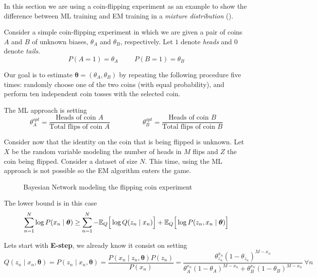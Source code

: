In this section we are using a coin-flipping experiment as an example to show the difference between ML training and EM training in a \emph{mixture distribution} (\cite{do2008expectation}).

Consider a simple coin-flipping experiment in which we are given a pair of coins \(A\) and \(B\) of unknown biases, \(\theta_{A}\)   and \(\theta_{B}\), respectively. Let \(1\) denote \textit{heads} and \(0\) denote \textit{tails}.
\[
  P(A = 1) = \theta_{A} \hspace{1cm} P(B = 1) = \theta_{B}
\]

Our goal is to estimate \(\bm{\theta} = (\theta_{A}, \theta_{B})\)  by repeating the following procedure five times: randomly choose one of the two coins (with equal probability), and perform ten independent coin tosses with the selected coin.

The ML approach is setting
\[
  \theta_{A}^{opt} = \frac{\text{Heads of coin }A}{\text{Total flips of coin }A} \hspace{2cm} \theta_{B}^{opt} = \frac{\text{Heads of coin }B}{\text{Total flips of coin }B}
\]

Consider now that the identity on the coin that is being flipped is unknown. Let \(X\) be the random variable modeling the number of heads in \(M\) flips and \(Z\) the coin being flipped. Consider a dataset of size \(N\). This time, using the ML approach is not possible so the EM algorithm enters the game.

\begin{figure}
  \centering
  \caption{Bayesian Network modeling the flipping coin experiment}
\end{figure}


The lower bound is in this case
\[
  \sum_{n=1}^{N}\log{P(x_{n} \mid \bm{\theta})} \geq \sum_{n=1}^{N}-\mathbb{E}_{Q}\Big[\log{Q(z_{n}\mid x_{n})}\Big] + \mathbb{E}_{Q}\Big[\log{P(z_{n}, x_{n} \mid \bm{\theta})}\Big]
\]

Lets start with \textbf{E-step}, we already know it consist on setting
\[
  Q(z_{n} \mid x_{n}, \bm{\theta}) = P(z_{n} \mid x_{n}, \bm{\theta}) = \frac{P(x_{n} \mid z_{n}, \bm{\theta})P(z_{n})}{P(x_{n})} = \frac{\theta_{z_{n}}^{x_{n}}(1-\theta_{z_{n}})^{M - x_{n}}}{  \theta_{A}^{x_{n}}(1-\theta_{A})^{M - x_{n}} + \theta_{B}^{x_{n}}(1-\theta_{B})^{M - x_{n}}} \ \forall n
\]

